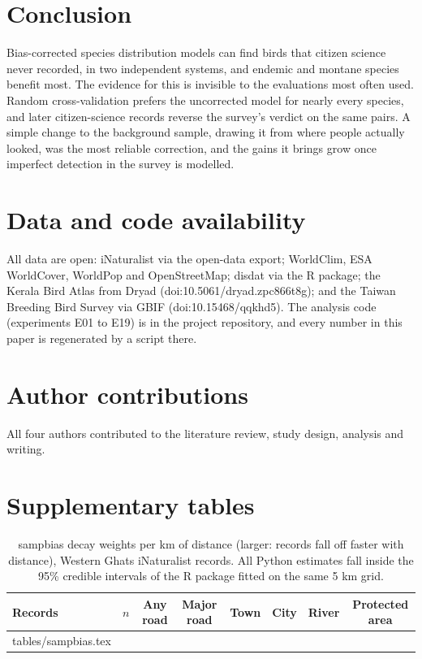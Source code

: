 \documentclass[11pt]{article}
\makeatletter
\newcommand{\tabinput}[1]{\@@input #1 }
\makeatother
\begin{document}
\section{Conclusion}
Bias-corrected species distribution models can find birds that citizen science never recorded, in two independent systems, and endemic and montane species benefit most. The evidence for this is invisible to the evaluations most often used. Random cross-validation prefers the uncorrected model for nearly every species, and later citizen-science records reverse the survey's verdict on the same pairs. A simple change to the background sample, drawing it from where people actually looked, was the most reliable correction, and the gains it brings grow once imperfect detection in the survey is modelled.

\section*{Data and code availability}
\sloppy
All data are open: iNaturalist via the open-data export; WorldClim, ESA WorldCover, WorldPop and OpenStreetMap; disdat via the R package; the Kerala Bird Atlas from Dryad (doi:10.5061/dryad.zpc866t8g); and the Taiwan Breeding Bird Survey via GBIF (doi:10.15468/qqkhd5). The analysis code (experiments E01 to E19) is in the project repository, and every number in this paper is regenerated by a script there.

\section*{Author contributions}
All four authors contributed to the literature review, study design, analysis and writing.




\appendix
\section{Supplementary tables}

\begin{table}[h]
\centering\small
\caption{sampbias decay weights per km of distance (larger: records fall off faster with distance), Western Ghats iNaturalist records. All Python estimates fall inside the 95\% credible intervals of the R package fitted on the same 5 km grid.}
\label{tab:sampbias}
\begin{tabular}{@{}lrcccccc@{}}
\toprule
Records & $n$ & Any road & Major road & Town & City & River & Protected area \\
\midrule
\tabinput{tables/sampbias.tex}
\bottomrule
\end{tabular}
\end{table}
\end{document}
